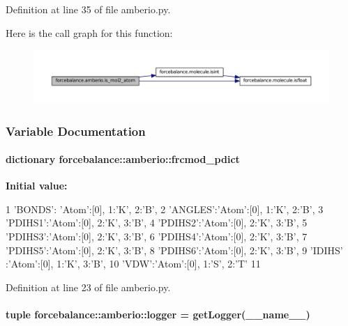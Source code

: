 \-Definition at line 35 of file amberio.\-py.



\-Here is the call graph for this function\-:
\nopagebreak
\begin{figure}[H]
\begin{center}
\leavevmode
\includegraphics[width=350pt]{namespaceforcebalance_1_1amberio_af59589a24e815a11db69dcaa21c51659_cgraph}
\end{center}
\end{figure}




\subsubsection{\-Variable \-Documentation}
\hypertarget{namespaceforcebalance_1_1amberio_ae5ba6128e5e02a120e8bcd688a5b1be4}{
\paragraph[{frcmod\-\_\-pdict}]{\setlength{\rightskip}{0pt plus 5cm}dictionary {\bf forcebalance\-::amberio\-::frcmod\-\_\-pdict}}}\label{namespaceforcebalance_1_1amberio_ae5ba6128e5e02a120e8bcd688a5b1be4}
{\bfseries \-Initial value\-:}
\begin{DoxyCode}
1 {'BONDS': {'Atom':[0], 1:'K', 2:'B'},
2                 'ANGLES':{'Atom':[0], 1:'K', 2:'B'},
3                 'PDIHS1':{'Atom':[0], 2:'K', 3:'B'},
4                 'PDIHS2':{'Atom':[0], 2:'K', 3:'B'},
5                 'PDIHS3':{'Atom':[0], 2:'K', 3:'B'},
6                 'PDIHS4':{'Atom':[0], 2:'K', 3:'B'},
7                 'PDIHS5':{'Atom':[0], 2:'K', 3:'B'},
8                 'PDIHS6':{'Atom':[0], 2:'K', 3:'B'},
9                 'IDIHS' :{'Atom':[0], 1:'K', 3:'B'},
10                 'VDW':{'Atom':[0], 1:'S', 2:'T'}
11                 }
\end{DoxyCode}


\-Definition at line 23 of file amberio.\-py.

\hypertarget{namespaceforcebalance_1_1amberio_aa9ff86ae6726b8e8fc8b27ddf29e095a}{
\paragraph[{logger}]{\setlength{\rightskip}{0pt plus 5cm}tuple {\bf forcebalance\-::amberio\-::logger} = get\-Logger(\-\_\-\-\_\-name\-\_\-\-\_\-)}}\label{namespaceforcebalance_1_1amberio_aa9ff86ae6726b8e8fc8b27ddf29e095a}


